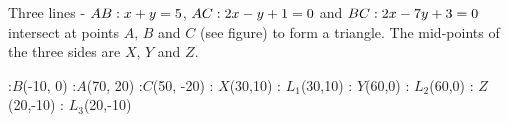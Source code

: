 




\FRACMINUS{}\pax\qax
{}\pax\qax\pay\qay

\FRACMULT{}\tp\tq
\FRACMINUS\tp\tq{}\pbx\qbx
{}\va\pbx\qbx\pby\qby

\FRACMULT{}\tp\tq
\FRACMINUS{}\tp\tq\pcx\qcx
{}\pcx\qcx\pcy\qcy


\FRACADD\pax\qax\pbx\qbx\tp\tq
\FRACDIV\tp{}\pxx\qxx %
\FRACADD\pay\qay\pby\qby\tp\tq
\FRACDIV\tp{}\pxy\qxy %

\FRACADD\pax\qax\pcx\qcx\tp\tq
\FRACDIV\tp{}\pyx\qyx %
\FRACADD\pay\qay\pcy\qcy\tp\tq
\FRACDIV\tp{}\pyy\qyy %

\FRACADD\pbx\qbx\pcx\qcx\tp\tq
\FRACDIV\tp{}\pzx\qzx %
\FRACADD\pby\qby\pcy\qcy\tp\tq
\FRACDIV\tp{}\pzy\qzy %

\FRACMINUS\pxy\qxy\pxx\qxx\mx\nx
\FRACMULT\pyx{}\tp\tq
\FRACMINUS\pyy\qyy\tp\tq\my\ny
\FRACMULT\pzx{}\tp\tq
\FRACMINUS\pzy\qzy\tp\tq\mz\nz

\FRACMINUS\my\ny\mx\nx\ansxp\ansxq
\FRACMULT\ansxp{}\ansxp\ansxq
\FRACADD\ansxp\ansxq\mx\nx\ansyp\ansyq

\question Three lines - $AB: x + y = 5$, $AC: 2x - y + 1 = 0$  
and $BC: 2x - 7y + 3 = 0$ intersect at points $A,\, B$ and $C$ (see figure) to form 
a triangle. The mid-points of the three sides are $X,\,Y$ and $Z$.

\watchout

  :$B$(-10, 0)
  :$A$(70, 20)
  :$C$(50, -20)
  : $X$(30,10)
  : $L_1$(30,10)
  : $Y$(60,0)
  : $L_2$(60,0)
  : $Z$(20,-10)
  : $L_3$(20,-10)
\figdrawbegin{}
  \figdrawline [10, 20]
  \figdrawline [20, 30]
  \figdrawline [30, 10]
\figdrawend
{}

